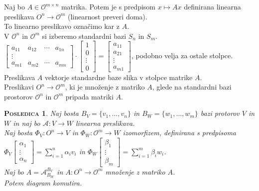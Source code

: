 \documentclass[a4paper,12pt]{article}
\newtheorem*{posledica}{\textsc{Posledica}}
\begin{document}
Naj bo $A\in \mathcal{O}^{m\times n}$ matrika. Potem je s predpisom $x\mapsto Ax$ definirana linearna preslikava $O^n\to \mathcal{O}^m$ (linearnost preveri doma). \\

To linearno preslikavo označimo kar z $A$. \\

V $\mathcal{O} ^n$ in $\mathcal{O}^m$ si izberemo standardni bazi $S_n$ in $S_m$. \\

$\begin{bmatrix}
	a_{11} & a_{12} & \cdots & a_{1n} \\
	\vdots & & & \\
	a_{m1} & a_{m2} & \cdots & a_{mn} 
\end{bmatrix} \cdot 
\begin{bmatrix}
	1 \\
	0 \\
	\vdots \\
	0
\end{bmatrix} =
\begin{bmatrix}
	a_{11} \\
	a_{21} \\
	\vdots \\
	a_{m1}
\end{bmatrix}$, podobno velja za ostale stolpce. \\

Preslikava $A$ vektorje standardne baze slika v stolpce matrike $A$. \\

Preslikavi $O^n\to \mathcal{O}^m$, ki je množenje z matriko $A$, glede na standardni bazi prostorov $\mathcal{O} ^n$ in $\mathcal{O}^m$ pripada matriki $A$. \\

\begin{posledica}
	Naj bosta $B_V=\{v_1,\ldots,v_n\}$ in $B_W=\{w_1,\ldots,w_m\}$ bazi protorov $V$ in $W$ in naj bo $\mathcal{A}:V\to W$ linearna preslikava. \\

Naj bosta $\Phi_V:O^n\to V$ in $\Phi_W:\mathcal{O}^m\to W$ izomorfizem, definirana s predpisoma $\Phi_V \begin{bmatrix} \alpha_1 \\ \vdots \\ \alpha_n \end{bmatrix}=\sum_{i=1}^n \alpha_i v_i$ in $\Phi_W \begin{bmatrix} \beta_1 \\ \vdots \\ \beta_m \end{bmatrix} = \sum_{i=1}^m \beta_i w_i$. \\

	Naj bo $A=\mathcal{A}_{B_W}^{B_V}$ in $A:O^n\to \mathcal{O}^m$ množenje z matriko $A$. \\

	Potem diagram \Smiley{} komutira.\\
\end{posledica}
\end{document}
